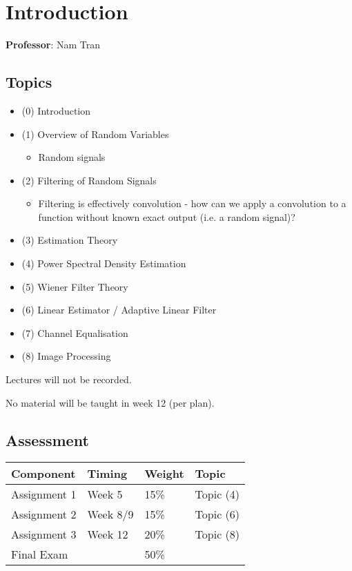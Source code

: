 \documentclass[12pt]{article}
\begin{document}
\begin{flushright}[Lecture on 1.1]\end{flushright}

\section{Introduction}
\textbf{Professor}: Nam Tran

\subsection{Topics}
\begin{itemize}[noitemsep]
    \item (0) Introduction
    \item (1) Overview of Random Variables
    \begin{itemize}[noitemsep]
        \item Random signals
    \end{itemize}
    \item (2) Filtering of Random Signals
    \begin{itemize}[noitemsep]
        \item Filtering is effectively convolution - how can we apply a convolution to a function without known exact output (i.e. a random signal)?
    \end{itemize}
    \item (3) Estimation Theory
    \item (4) Power Spectral Density Estimation
    \item (5) Wiener Filter Theory
    \item (6) Linear Estimator / Adaptive Linear Filter
    \item (7) Channel Equalisation
    \item (8) Image Processing
\end{itemize}
Lectures will not be recorded.

No material will be taught in week 12 (per plan).

\subsection{Assessment}
    \begin{tabular}{ |l l l l| }
        \hline
        \textbf{Component} & \textbf{Timing} & \textbf{Weight} & \textbf{Topic} \\ \hline
        Assignment 1       & Week 5        & 15\% & Topic (4) \\ \hline
        Assignment 2       & Week 8/9      & 15\% & Topic (6) \\ \hline
        Assignment 3       & Week 12       & 20\% & Topic (8) \\ \hline
        Final Exam         &               & 50\% & \\ \hline
    \end{tabular}
\end{document}
